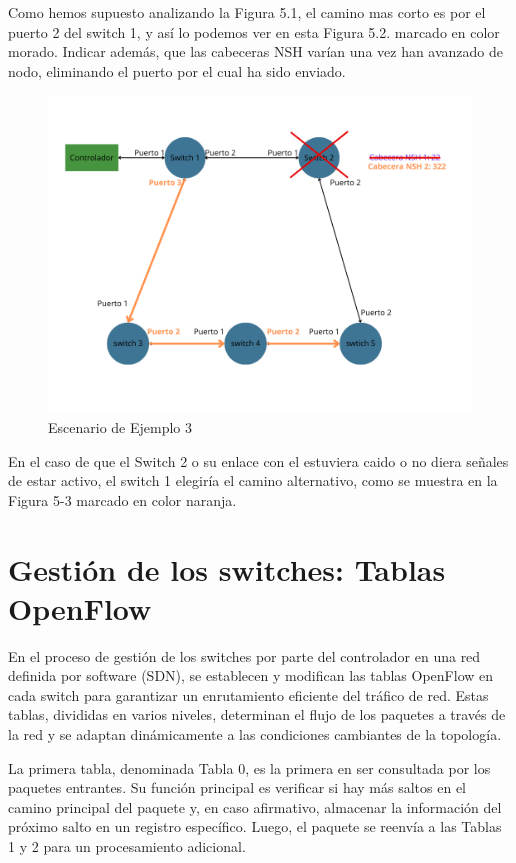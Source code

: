 \documentclass[a4paper, 12pt]{book}
\begin{document}
	Como hemos supuesto analizando la Figura 5.1, el camino mas corto es por el puerto 2 del switch 1, y así lo podemos ver en esta Figura 5.2. marcado en color morado. Indicar además, que las cabeceras NSH varían una vez han avanzado de nodo, eliminando el puerto por el cual ha sido enviado.
	
	\begin{figure}[H]
		\centering
		\includegraphics[width=16cm, keepaspectratio]{img/Ejemplo Periplus 3}
		\caption{Escenario de Ejemplo 3}
		\label{figura:PeriplusEj3}
	\end{figure}
	
	En el caso de que el Switch 2 o su enlace con el estuviera caido o no diera señales de estar activo, el switch 1 elegiría el camino alternativo, como se muestra en la Figura 5-3 marcado en color naranja.

	\section{Gestión de los switches: Tablas OpenFlow}
	
	En el proceso de gestión de los switches por parte del controlador en una red definida por software (SDN), se establecen y modifican las tablas OpenFlow en cada switch para garantizar un enrutamiento eficiente del tráfico de red. Estas tablas, divididas en varios niveles, determinan el flujo de los paquetes a través de la red y se adaptan dinámicamente a las condiciones cambiantes de la topología.
	
	La primera tabla, denominada Tabla 0, es la primera en ser consultada por los paquetes entrantes. Su función principal es verificar si hay más saltos en el camino principal del paquete y, en caso afirmativo, almacenar la información del próximo salto en un registro específico. Luego, el paquete se reenvía a las Tablas 1 y 2 para un procesamiento adicional.
	
\end{document}

